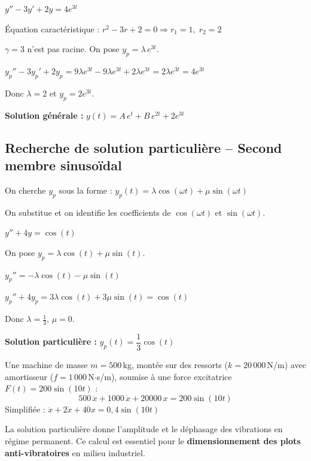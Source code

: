 \documentclass[a4paper,11pt]{article}
\begin{document}
\begin{exemple}[6]
$y'' - 3y' + 2y = 4e^{3t}$

Équation caractéristique : $r^2 - 3r + 2 = 0 \Rightarrow r_1 = 1,\; r_2 = 2$

$\gamma = 3$ n'est pas racine. On pose $y_p = \lambda\,e^{3t}$.

$y_p'' - 3y_p' + 2y_p = 9\lambda e^{3t} - 9\lambda e^{3t} + 2\lambda e^{3t} = 2\lambda e^{3t} = 4e^{3t}$

Donc $\lambda = 2$ et $y_p = 2e^{3t}$.

\textbf{Solution générale :} $y(t) = A\,e^{t} + B\,e^{2t} + 2e^{3t}$
\end{exemple}

\subsection{Recherche de solution particulière -- Second membre sinusoïdal}

\begin{methode}[-- $f(t) = P\cos(\omega t) + Q\sin(\omega t)$]
On cherche $y_p$ sous la forme : $y_p(t) = \lambda\cos(\omega t) + \mu\sin(\omega t)$

On substitue et on identifie les coefficients de $\cos(\omega t)$ et $\sin(\omega t)$.
\end{methode}

\begin{exemple}[7]
$y'' + 4y = \cos(t)$

On pose $y_p = \lambda\cos(t) + \mu\sin(t)$.

$y_p'' = -\lambda\cos(t) - \mu\sin(t)$

$y_p'' + 4y_p = 3\lambda\cos(t) + 3\mu\sin(t) = \cos(t)$

Donc $\lambda = \frac{1}{3}$, $\mu = 0$.

\textbf{Solution particulière :} $y_p(t) = \dfrac{1}{3}\cos(t)$
\end{exemple}

\begin{appliindus}
Une machine de masse $m = 500\,$kg, montée sur des ressorts ($k = 20\,000\,$N/m) avec amortisseur ($f = 1\,000\,$N$\cdot$s/m), soumise à une force excitatrice $F(t) = 200\sin(10t)$ :
\[
500\,\ddot{x} + 1000\,\dot{x} + 20000\,x = 200\sin(10t)
\]
Simplifiée : $\ddot{x} + 2\dot{x} + 40x = 0{,}4\sin(10t)$

La solution particulière donne l'amplitude et le déphasage des vibrations en régime permanent. Ce calcul est essentiel pour le \textbf{dimensionnement des plots anti-vibratoires} en milieu industriel.
\end{appliindus}
\end{document}
